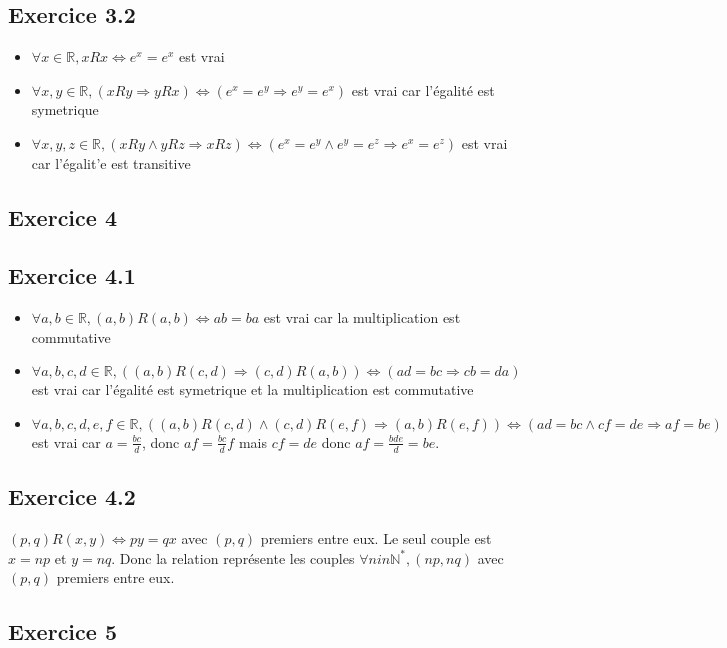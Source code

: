 \documentclass[]{book}
\theoremstyle{definition}
\newcommand{\bb}[1]{\mathbb{#1}}
\newcommand{\R}{\bb{R}}
\newcommand{\N}{\bb{N}}
\begin{document}
\subsection*{Exercice 3.2}
\begin{itemize}
\item $\forall x \in \R, xRx \Leftrightarrow e^x = e^x$ est vrai
\item $\forall x,y \in \R, (xRy \Rightarrow yRx) \Leftrightarrow (e^x = e^y \Rightarrow e^y = e^x)$ est vrai car l'\'egalit\'e est symetrique
\item $\forall x,y,z \in \R, (xRy \wedge yRz \Rightarrow xRz) \Leftrightarrow (e^x = e^y \wedge e^y = e^z \Rightarrow e^x = e^z)$ est vrai car l'\'egalit'e est transitive
\end{itemize}

\subsection*{Exercice 4}
\subsection*{Exercice 4.1}
\begin{itemize}
\item $\forall a,b \in \R, (a,b)R(a,b) \Leftrightarrow ab = ba$ est vrai car la multiplication est commutative
\item $\forall a,b,c,d \in \R, ((a,b)R(c,d) \Rightarrow (c,d)R(a,b)) \Leftrightarrow (ad = bc \Rightarrow cb = da)$ est vrai car l'\'egalit\'e est symetrique et la multiplication est commutative
\item $\forall a,b,c,d,e,f \in \R, ((a,b)R(c,d) \wedge (c,d)R(e,f) \Rightarrow (a,b)R(e,f)) \Leftrightarrow (ad = bc \wedge cf = de \Rightarrow af = be)$ est vrai car $a = \frac{bc}{d}$, donc $af = \frac{bc}{d}f$ mais $cf=de$ donc $af = \frac{bde}{d} = be$. 
\end{itemize}

\subsection*{Exercice 4.2}
$(p,q)R(x,y) \Leftrightarrow py = qx$ avec $(p,q)$ premiers entre eux. Le seul couple est $x=np$ et $y=nq$. Donc la relation repr\'esente les couples $\forall n in \N^{*},(np,nq)$ avec $(p,q)$ premiers entre eux.


\subsection*{Exercice 5}
\end{document}
